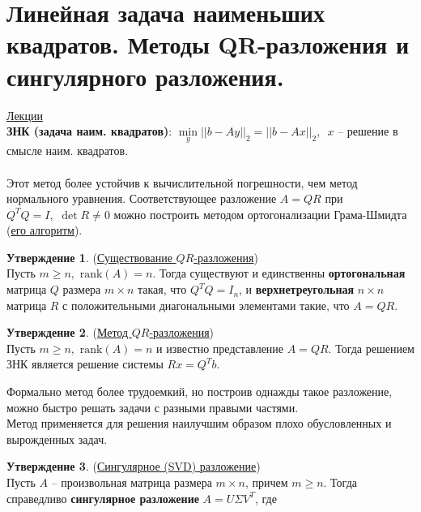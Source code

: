 \documentclass[specialist, subf, href, colorlinks=true, 12pt, times, mtpro, final]{disser}
\theoremstyle{definition}
\newtheorem{state}{Утверждение}[section]
\def\rk{\text{rank}}
\begin{document}
{\section {Линейная задача наименьших квадратов. Методы QR-разложения и сингулярного разложения.}
    \hyperlink {lects.72}{Лекции}\\
    {\bf ЗНК (задача наим. квадратов)}: $\min\limits_{y}||b - Ay||_2 = ||b - Ax||_2$,\,\, $x$ -- решение в смысле наим. квадратов.\\
    \\
    Этот метод более устойчив к вычислительной погрешности, чем метод нормального уравнения.
    Соответствующее разложение $A = QR$ при $Q^TQ = I, \,\, \det R \ne 0$ можно построить
    методом ортогонализации Грама-Шмидта (\hyperlink {lects.72}{его алгоритм}).
    \begin{state} (\hyperlink {lects.72}{Существование $QR$-разложения})\\
    Пусть $m \ge n, \,\, \rk(A) = n$. Тогда существуют и единственны {\bf ортогональная}
    матрица $Q$ размера $m\times n$ такая, что $Q^T Q = I_n$, и {\bf верхнетреугольная}
    $n\times n$ матрица $R$ с положительными диагональными элементами такие, что $A=QR$.
    \end{state}
    \begin{state} (\hyperlink {lects.72}{Метод $QR$-разложения})\\
    Пусть $m \ge n, \,\, \rk(A) = n$ и известно представление $A=QR$. Тогда решением ЗНК
    является решение системы $Rx = Q^T b$.
    \end{state}
    Формально метод более трудоемкий, но построив однажды такое разложение, можно быстро
    решать задачи с разными правыми частями.
    \\
    Метод применяется для решения наилучшим образом плохо обусловленных и вырожденных задач.
    \begin{state} (\hyperlink {lects.73}{Сингулярное (SVD) разложение})\\
    Пусть $A$ -- произвольная матрица размера $m\times n$, причем $m \ge n$. Тогда
    справедливо {\bf сингулярное разложение} $A = U\Sigma V^T$, где
\end{state}}
\end{document}
